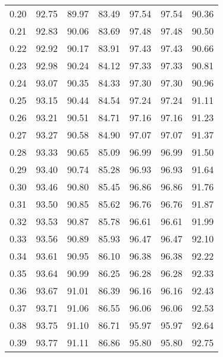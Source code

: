 \begin{tabular}{|c|c|c|c|c|c|c|}
      0.20 &     92.75 &     89.97 &      83.49 &   97.54 &      97.54 &         90.36 \\
      0.21 &     92.83 &     90.06 &      83.69 &   97.48 &      97.48 &         90.50 \\
      0.22 &     92.92 &     90.17 &      83.91 &   97.43 &      97.43 &         90.66 \\
      0.23 &     92.98 &     90.24 &      84.12 &   97.33 &      97.33 &         90.81 \\
      0.24 &     93.07 &     90.35 &      84.33 &   97.30 &      97.30 &         90.96 \\
      0.25 &     93.15 &     90.44 &      84.54 &   97.24 &      97.24 &         91.11 \\
      0.26 &     93.21 &     90.51 &      84.71 &   97.16 &      97.16 &         91.23 \\
      0.27 &     93.27 &     90.58 &      84.90 &   97.07 &      97.07 &         91.37 \\
      0.28 &     93.33 &     90.65 &      85.09 &   96.99 &      96.99 &         91.50 \\
      0.29 &     93.40 &     90.74 &      85.28 &   96.93 &      96.93 &         91.64 \\
      0.30 &     93.46 &     90.80 &      85.45 &   96.86 &      96.86 &         91.76 \\
      0.31 &     93.50 &     90.85 &      85.62 &   96.76 &      96.76 &         91.87 \\
      0.32 &     93.53 &     90.87 &      85.78 &   96.61 &      96.61 &         91.99 \\
      0.33 &     93.56 &     90.89 &      85.93 &   96.47 &      96.47 &         92.10 \\
      0.34 &     93.61 &     90.95 &      86.10 &   96.38 &      96.38 &         92.22 \\
      0.35 &     93.64 &     90.99 &      86.25 &   96.28 &      96.28 &         92.33 \\
      0.36 &     93.67 &     91.01 &      86.39 &   96.16 &      96.16 &         92.43 \\
      0.37 &     93.71 &     91.06 &      86.55 &   96.06 &      96.06 &         92.53 \\
      0.38 &     93.75 &     91.10 &      86.71 &   95.97 &      95.97 &         92.64 \\
      0.39 &     93.77 &     91.11 &      86.86 &   95.80 &      95.80 &         92.75 \\

\end{tabular}
